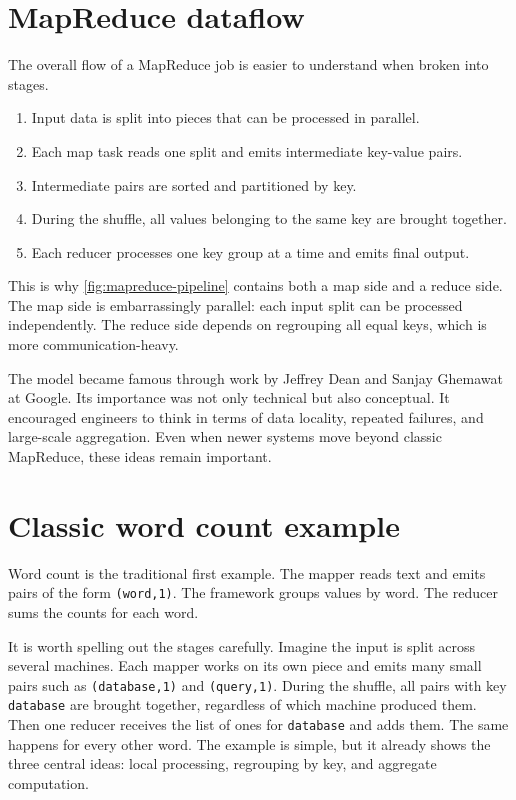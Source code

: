\documentclass[11pt,a4paper,openany]{book}
\begin{document}
\section{MapReduce dataflow}
The overall flow of a MapReduce job is easier to understand when broken into stages.

\begin{enumerate}
\item Input data is split into pieces that can be processed in parallel.
\item Each map task reads one split and emits intermediate key-value pairs.
\item Intermediate pairs are sorted and partitioned by key.
\item During the shuffle, all values belonging to the same key are brought together.
\item Each reducer processes one key group at a time and emits final output.
\end{enumerate}

This is why \cref{fig:mapreduce-pipeline} contains both a map side and a reduce side. The map side is embarrassingly parallel: each input split can be processed independently. The reduce side depends on regrouping all equal keys, which is more communication-heavy.

The model became famous through work by Jeffrey Dean and Sanjay Ghemawat at Google. Its importance was not only technical but also conceptual. It encouraged engineers to think in terms of data locality, repeated failures, and large-scale aggregation. Even when newer systems move beyond classic MapReduce, these ideas remain important.

\section{Classic word count example}
Word count is the traditional first example. The mapper reads text and emits pairs of the form \texttt{(word,1)}. The framework groups values by word. The reducer sums the counts for each word.

It is worth spelling out the stages carefully. Imagine the input is split across several machines. Each mapper works on its own piece and emits many small pairs such as \texttt{(database,1)} and \texttt{(query,1)}. During the shuffle, all pairs with key \texttt{database} are brought together, regardless of which machine produced them. Then one reducer receives the list of ones for \texttt{database} and adds them. The same happens for every other word. The example is simple, but it already shows the three central ideas: local processing, regrouping by key, and aggregate computation.
\end{document}
